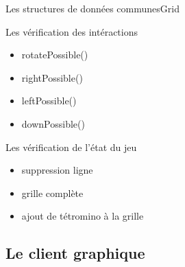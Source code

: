 \documentclass[french]{beamer}
\begin{document}
			\begin{frame}{Les structures de données communes}{Grid}	

				\begin{block}{Les vérification des intéractions}
					\begin{itemize}
						\item rotatePossible()
						\item rightPossible()
						\item leftPossible()
						\item downPossible()
					\end{itemize}
				\end{block}

				\begin{block}{Les vérification de l'état du jeu}
					\begin{itemize}
						\item suppression ligne
						\item grille complète
						\item ajout de tétromino à la grille
					\end{itemize}
				\end{block}
				
			\end{frame}

		



	\subsection{Le client graphique}
\end{document}
